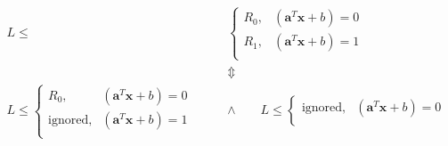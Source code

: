 \documentclass[onecolumn]{ctexart}
\begin{document}
\begin{equation}
    \begin{aligned}
        L
        \leq &
        \begin{cases}
            R_0,  & (\mathbf{a}^T \mathbf{x} + b) = 0  \\
            R_1,  & (\mathbf{a}^T \mathbf{x} + b) = 1  \\
        \end{cases}
        \\
        & \Updownarrow
        \\
        L
        \leq 
        \begin{cases}
            R_0           ,  & (\mathbf{a}^T \mathbf{x} + b) = 0  \\
            \text{ignored},  & (\mathbf{a}^T \mathbf{x} + b) = 1  \\
        \end{cases}
        \qquad & \land \qquad
        L
        \leq 
        \begin{cases}
            \text{ignored},  & (\mathbf{a}^T \mathbf{x} + b) = 0  \\

\end{cases}
\end{aligned}
\end{equation}
\end{document}
